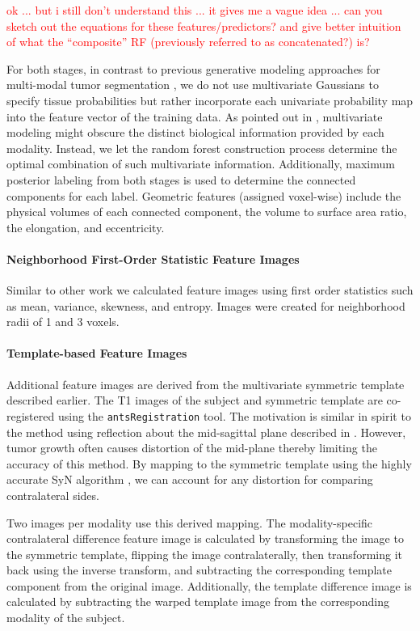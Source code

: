 \documentclass[final,5p,times,twocolumn]{elsarticle}
\begin{document}
\textcolor{red}{ok ... but i still don't understand this ... it gives
  me a vague idea ... can you sketch out the equations for these
  features/predictors? and give better intuition of what the
  ``composite'' RF (previously referred to as concatenated?) is?}

For both stages, in contrast to previous generative
modeling approaches for multi-modal tumor segmentation 
\citep[e.g.,][]{prastawa2003}, we do not use multivariate 
Gaussians to specify tissue probabilities but rather incorporate each
univariate probability map into the feature vector of the training
data.  As pointed out in \cite{menze2010}, multivariate modeling
might obscure the distinct biological information provided by each 
modality.  Instead, we let the random forest construction 
process determine the optimal combination of such multivariate
information.  Additionally, maximum posterior labeling from both stages
is used to determine the connected components for each label.  
Geometric features (assigned voxel-wise) include the physical volumes 
of each connected component, the volume to surface area ratio, 
the elongation, and eccentricity. 

\paragraph{Neighborhood First-Order Statistic Feature Images}
Similar to other work \cite{bauer2012,zikic2012} we calculated
feature images using first order statistics such as mean, 
variance, skewness, and entropy.  Images were created for 
neighborhood radii of 1 and 3 voxels.

\paragraph{Template-based Feature Images}
Additional feature images are derived from the multivariate 
symmetric template described earlier. The T1 images of the 
subject and symmetric template are co-registered 
\citep{tustison2013a} using the {\tt antsRegistration} 
tool.  The motivation is similar in spirit to the method
using reflection about the mid-sagittal plane described in 
\cite{geremia2012}.  However, tumor growth often causes 
distortion of the mid-plane thereby limiting the accuracy of
this method.  By mapping to the symmetric template using the
highly accurate SyN algorithm \cite{avants2011a}, we can 
account for any distortion for comparing contralateral
sides.

Two images per modality use this derived mapping.  The modality-specific
contralateral difference feature image is calculated by transforming
the image to the symmetric template, flipping the image contralaterally,
then transforming it back using the inverse transform, and subtracting
the corresponding template component from the original image.  Additionally, 
the template difference image is calculated by subtracting the warped template 
image from the corresponding modality of the subject.
\end{document}
